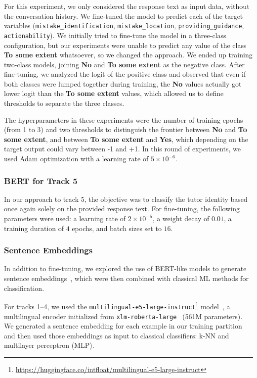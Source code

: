 \documentclass[11pt]{article}
\newcommand{\todo}[1]{\textcolor{blue}{\textbf{\small [TODO: #1]}}}
\begin{document}
For this experiment, we only considered the response text as input data, without the conversation history. We fine-tuned the model to predict each of the target variables (\texttt{mistake\_identification}, \texttt{mistake\_location}, \texttt{providing\_guidance}, \texttt{actionability}).
We initially tried to fine-tune the model in a three-class configuration, but our experiments were unable to predict any value of the class \textbf{To some extent} whatsoever, so we changed the approach.
We ended up training two-class models, joining \textbf{No} and \textbf{To some extent} as the negative class.
After fine-tuning, we analyzed the logit of the positive class and observed that even if both classes were lumped together during training, the \textbf{No} values actually got lower logit than the \textbf{To some extent} values, which allowed us to define thresholds to separate the three classes.

The hyperparameters in these experiments were the number of training epochs (from 1 to 3) and two thresholds to distinguish the frontier between \textbf{No} and \textbf{To some extent}, and between \textbf{To some extent} and \textbf{Yes}, which depending on the target output could vary between -1 and +1. In this round of experiments, we used Adam optimization with a learning rate of $5 \times 10^{-6}$.

\subsubsection{BERT for Track 5}

In our approach to track 5, the objective was to classify the tutor identity based once again solely on the provided response text. For fine-tuning, the following parameters were used: a learning rate of $2 \times 10^{-5}$, a weight decay of $0.01$, a training duration of $4$ epochs, and batch sizes set to $16$.


\subsubsection{Sentence Embeddings}

In addition to fine-tuning, we explored the use of BERT-like models to generate sentence embeddings~\cite{reimers-gurevych-2019-sentence}, which were then combined with classical ML methods for classification.

For tracks 1--4, we used the \texttt{multilingual-e5-large-instruct}\footnote{\url{https://huggingface.co/intfloat/multilingual-e5-large-instruct}} model~\cite{wang2024multilingual}, a multilingual encoder initialized from \texttt{xlm-roberta-large}~\cite{conneau2019xlmroberta} (561M parameters).
We generated a sentence embedding for each example in our training partition and then used those embeddings as input to classical classifiers: k-NN and multilayer perceptron (MLP).
\end{document}
